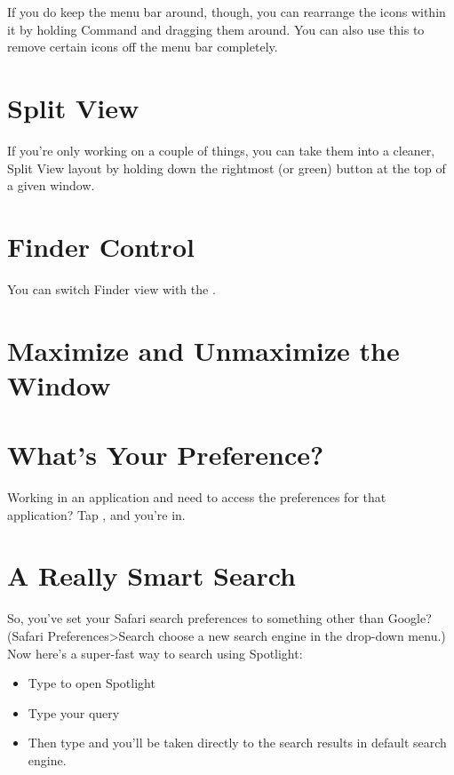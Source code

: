 If you do keep the menu bar around, though, you can rearrange the icons within it by holding Command and dragging them around.
You can also use this to remove certain icons off the menu bar completely.


\section{Split View}

If you're only working on a couple of things, you can take them into a cleaner, Split View layout by holding down the rightmost (or green) button at the top of a given window.




\section{Finder Control}
You can switch Finder view with the .


\section{Maximize and Unmaximize the Window}


\section{What's Your Preference?}

Working in an application and need to access the preferences for that application? Tap , and you’re in.

\section{A Really Smart Search}

So, you’ve set your Safari search preferences to something other than Google? (Safari Preferences>Search choose a new search engine in the drop-down menu.)
Now here’s a super-fast way to search using Spotlight:

\begin{itemize}
\item Type  to open Spotlight
\item Type your query
\item Then type  and you’ll be taken directly to the search results in default search engine.
\end{itemize}


